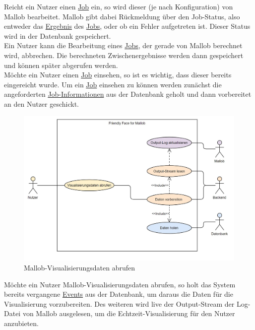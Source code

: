 Reicht ein \gls{Nutzer} einen \hyperref[B:Jobs]{Job} ein, so wird dieser (je nach Konfiguration) von Mallob bearbeitet. Mallob gibt dabei Rückmeldung über den Job-Status, also entweder das \hyperref[B:Job-Ergebnis]{Ergebnis} des \hyperref[B:Jobs]{Jobs}, oder ob ein Fehler aufgetreten ist. Dieser Status wird in der \gls{Datenbank} gespeichert. \\
Ein \gls{Nutzer} kann die Bearbeitung eines \hyperref[B:Jobs]{Jobs}, der gerade von Mallob berechnet wird, abbrechen. Die berechneten Zwischenergebnisse werden dann gespeichert und können später abgerufen werden. \\
Möchte ein \gls{Nutzer} einen \hyperref[B:Jobs]{Job} einsehen, so ist es wichtig, dass dieser bereits eingereicht wurde. Um ein \hyperref[B:Jobs]{Job} einsehen zu können werden zunächst die angeforderten \hyperref[B:Job-Informationen]{Job-Informationen} aus der \gls{Datenbank} geholt und dann vorbereitet an den \gls{Nutzer} geschickt.




\begin{figure}[H]
    \centering
    \includegraphics[width=\textwidth]{images-interface/Diagramme/visualisierungsdaten_anwendungsfaelle.jpg}
    \caption{Mallob-Visualisierungsdaten abrufen}
\end{figure}
Möchte ein \gls{Nutzer} Mallob-Visualisierungsdaten abrufen, so holt das System bereits vergangene \hyperref[B:Event]{Events} aus der \gls{Datenbank}, um daraus die Daten für die Visualisierung vorzubereiten. Des weiteren wird live der Output-\gls{Stream} der \gls{Log-Datei} von Mallob ausgelesen, um die Echtzeit-Visualisierung für den \gls{Nutzer} anzubieten. 


